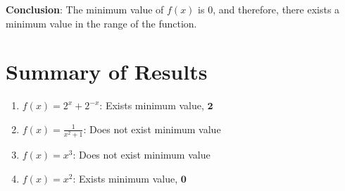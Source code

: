 \documentclass[12pt]{article}
\begin{document}
\textbf{Conclusion}: The minimum value of \( f(x) \) is 0, and therefore, there exists a minimum value in the range of the function.

\section*{Summary of Results}

\begin{enumerate}
    \item \( f(x) = 2^x + 2^{-x} \): Exists minimum value, \( \mathbf{2} \)
    \item \( f(x) = \frac{1}{x^2 + 1} \): Does not exist minimum value
    \item \( f(x) = x^3 \): Does not exist minimum value
    \item \( f(x) = x^2 \): Exists minimum value, \( \mathbf{0} \)
\end{enumerate}
\end{document}
